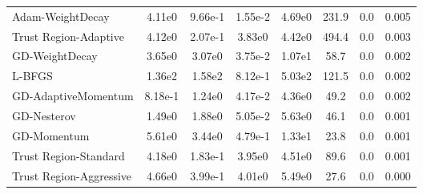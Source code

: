 \documentclass{article}
\begin{document}
\begin{table}[htbp]
{\begin{tabular}{p{2.5cm}*{7}{c}}
Adam-WeightDecay & 4.11e0 & 9.66e-1 & 1.55e-2 & 4.69e0 & 231.9 & 0.0 & 0.005 \\
Trust Region-Adaptive & 4.12e0 & 2.07e-1 & 3.83e0 & 4.42e0 & 494.4 & 0.0 & 0.003 \\
GD-WeightDecay & 3.65e0 & 3.07e0 & 3.75e-2 & 1.07e1 & 58.7 & 0.0 & 0.002 \\
L-BFGS & 1.36e2 & 1.58e2 & 8.12e-1 & 5.03e2 & 121.5 & 0.0 & 0.002 \\
GD-AdaptiveMomentum & 8.18e-1 & 1.24e0 & 4.17e-2 & 4.36e0 & 49.2 & 0.0 & 0.002 \\
GD-Nesterov & 1.49e0 & 1.88e0 & 5.05e-2 & 5.63e0 & 46.1 & 0.0 & 0.001 \\
GD-Momentum & 5.61e0 & 3.44e0 & 4.79e-1 & 1.33e1 & 23.8 & 0.0 & 0.001 \\
Trust Region-Standard & 4.18e0 & 1.83e-1 & 3.95e0 & 4.51e0 & 89.6 & 0.0 & 0.001 \\
Trust Region-Aggressive & 4.66e0 & 3.99e-1 & 4.01e0 & 5.49e0 & 27.6 & 0.0 & 0.000 \\
\bottomrule
\end{tabular}
}
\end{table}
\end{document}
